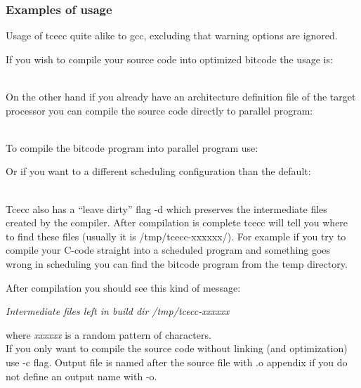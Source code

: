 \documentclass[twoside]{tceusermanual}
\begin{document}
\subsubsection{Examples of usage}

Usage of tcecc quite alike to gcc, excluding that warning options are
ignored.

If you wish to compile your source code into optimized bitcode the
usage is:

 \\

On the other hand if you already have an architecture definition file of the
target processor you can compile the source code directly to parallel program:

 \\

To compile the bitcode program into parallel program use:


Or if you want to a different scheduling configuration than the default:

 \\

Tcecc also has a ``leave dirty'' flag -d which preserves the intermediate
files created by the compiler. After compilation is complete tcecc will tell
you where to find these files (usually it is /tmp/tcecc-xxxxxx/). For example
if you try to compile your C-code straight into a scheduled program and
something goes wrong in scheduling you can find the bitcode program from the
temp directory.


After compilation you should see this kind of message:

\textit{Intermediate files left in build dir /tmp/tcecc-xxxxxx}

where \textit{xxxxxx} is a random pattern of characters. \\

If you only want to compile the source code without linking
(and optimization) use -c flag. Output file is named after the source file
with .o appendix if you do not define an output name with -o.
\end{document}
